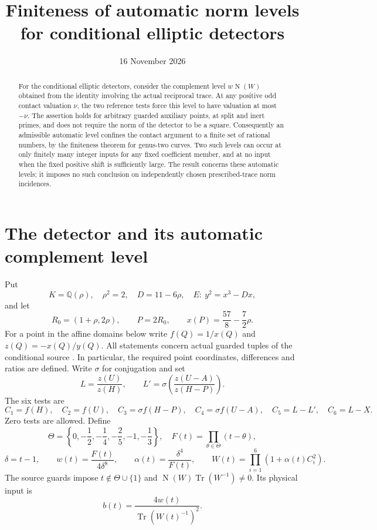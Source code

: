 \documentclass[11pt,a4paper]{article}
\title{Finiteness of automatic norm levels for conditional elliptic detectors}
\author{}\date{16 November 2026}
\newcommand{\Q}{\mathbb Q}\newcommand{\Z}{\mathbb Z}
\DeclareMathOperator{\Tr}{Tr}\DeclareMathOperator{\N}{N}
\begin{document}
\maketitle
\begin{abstract}
For the conditional elliptic detectors, consider the complement level
$w\N(W)$ obtained from the identity involving the actual reciprocal
trace. At any positive odd contact valuation $\nu$, the two reference
tests force this level to have valuation at most $-\nu$. The assertion
holds for arbitrary guarded auxiliary points, at split and inert primes,
and does not require the norm of the detector to be a square.
Consequently an admissible automatic level confines the contact argument
to a finite set of rational numbers, by the finiteness theorem for
genus-two curves. Two such levels can occur at only finitely many
integer inputs for any fixed coefficient member, and at no input when
the fixed positive shift is sufficiently large. The result concerns
these automatic levels; it imposes no such conclusion on independently
chosen prescribed-trace norm incidences.
\end{abstract}

\section{The detector and its automatic complement level}

Put
\[
 K=\Q(\rho),\quad \rho^2=2,\quad D=11-6\rho,\quad
 E:\ y^2=x^3-Dx,
\]
and let
\[
 R_0=(1+\rho,2\rho),\qquad P=2R_0,
 \qquad x(P)=\frac{57}{8}-\frac72\rho.
\]
For a point in the affine domains below write
$f(Q)=1/x(Q)$ and $z(Q)=-x(Q)/y(Q)$.
All statements concern actual guarded tuples of the conditional source
\cite{Direct}. In particular, the required point coordinates,
differences and ratios are defined. Write $\sigma$ for conjugation and
set
\[
 L=\frac{z(U)}{z(H)},\qquad
 L'=\sigma\!\left(\frac{z(U-A)}{z(H-P)}\right).
\]
The six tests are
\begin{equation}\label{eq:tests}
 C_1=f(H),\quad C_2=f(U),\quad C_3=\sigma f(H-P),\quad
 C_4=\sigma f(U-A),\quad C_5=L-L',\quad C_6=L-X.
\end{equation}
Zero tests are allowed. Define
\[
 \Theta=\left\{0,-\frac12,-\frac14,-\frac25,-1,-\frac13\right\},
 \quad F(t)=\prod_{\theta\in\Theta}(t-\theta),
\]
\begin{equation}\label{eq:weights}
 \delta=t-1,\qquad
 w(t)=\frac{F(t)}{4\delta^8},\qquad
 \alpha(t)=\frac{\delta^4}{F(t)},\qquad
 W(t)=\prod_{i=1}^{6}(1+\alpha(t)C_i^2).
\end{equation}
The source guards impose $t\notin\Theta\cup\{1\}$ and
$\N(W)\Tr(W^{-1})\ne0$.
Its physical input is
\begin{equation}\label{eq:b}
                  b(t)=\frac{4w(t)}{\Tr(W(t)^{-1})^2}.
\end{equation}
\end{document}
